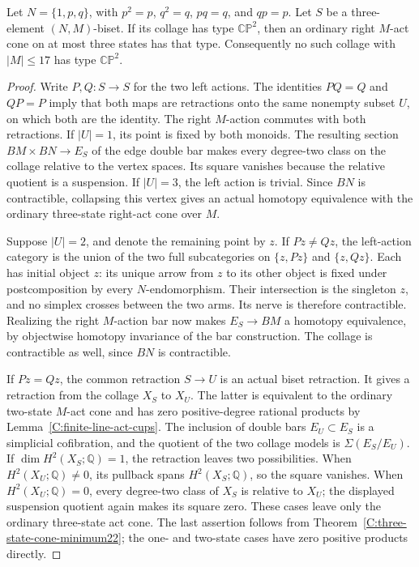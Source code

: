 \begin{lemma}
\label{C:three-state-right-zero-biset}
Let $N=\{1,p,q\}$, with $p^2=p$, $q^2=q$, $pq=q$, and $qp=p$.
Let $S$ be a three-element $(N,M)$-biset.  If its collage has
type $\mathbb{CP}^2$, then an ordinary right $M$-act cone on at
most three states has that type.  Consequently no such collage
with $|M|\leq17$ has type $\mathbb{CP}^2$.
\end{lemma}
\begin{proof}
Write $P,Q:S\to S$ for the two left actions.  The identities
$PQ=Q$ and $QP=P$ imply that both maps are retractions onto
the same nonempty subset $U$, on which both are the identity.
The right $M$-action commutes with both retractions.
If $|U|=1$, its point is fixed by both monoids.  The resulting
section $BM\times BN\to E_S$ of the edge double bar makes every
degree-two class on the collage relative to the vertex spaces.
Its square vanishes because the relative quotient is a suspension.
If $|U|=3$, the left action is trivial.  Since $BN$ is
contractible, collapsing this vertex gives an actual homotopy
equivalence with the ordinary three-state right-act cone over $M$.

Suppose $|U|=2$, and denote the remaining point by $z$.
If $Pz\ne Qz$, the left-action category is the union of the two
full subcategories on $\{z,Pz\}$ and $\{z,Qz\}$.  Each has
initial object $z$: its unique arrow from $z$ to its other object
is fixed under postcomposition by every $N$-endomorphism.  Their
intersection is the singleton $z$, and no simplex crosses between
the two arms.  Its nerve is therefore contractible.  Realizing
the right $M$-action bar now makes $E_S\to BM$ a homotopy
equivalence, by objectwise homotopy invariance of the bar construction.
The collage is contractible as well, since $BN$ is contractible.

If $Pz=Qz$, the common retraction $S\to U$ is an actual biset
retraction.  It gives a retraction from the collage $X_S$ to
$X_U$.  The latter is equivalent to the ordinary two-state
$M$-act cone and has zero positive-degree rational products by
Lemma~\ref{C:finite-line-act-cups}.  The inclusion of double bars
$E_U\subset E_S$ is a simplicial cofibration, and the quotient
of the two collage models is $\Sigma(E_S/E_U)$.  If
$\dim H^2(X_S;\mathbb Q)=1$, the retraction leaves two possibilities.
When $H^2(X_U;\mathbb Q)\ne0$, its pullback spans $H^2(X_S;\mathbb Q)$,
so the square vanishes.  When $H^2(X_U;\mathbb Q)=0$, every
degree-two class of $X_S$ is relative to $X_U$; the displayed
suspension quotient again makes its square zero.
These cases leave only the ordinary three-state act cone.
The last assertion follows from
Theorem~\ref{C:three-state-cone-minimum22}; the one- and two-state
cases have zero positive products directly.
\end{proof}

